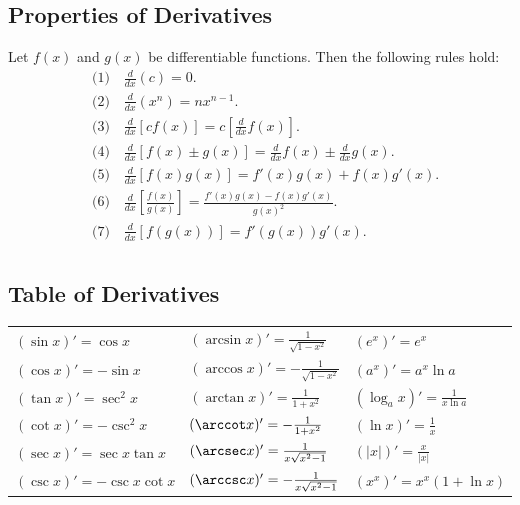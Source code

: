 \documentclass[a4paper,11pt]{article}
\begin{document}
\subsection{Properties of Derivatives}

\begin{tcolorbox}
    Let $f(x)$ and $g(x)$ be differentiable functions. Then the following rules hold:
    \[
    \begin{aligned}
        &\text{(1)} \quad \frac{d}{dx}(c) = 0. \\[8pt]  
        &\text{(2)} \quad \frac{d}{dx}(x^n) = nx^{n-1}. \\[8pt]
        &\text{(3)} \quad \frac{d}{dx}[cf(x)] = c[\frac{d}{dx}f(x)]. \\[8pt]
        &\text{(4)} \quad \frac{d}{dx}[f(x) \pm g(x)] = \frac{d}{dx}f(x) \pm \frac{d}{dx}g(x). \\[8pt]
        &\text{(5)} \quad \frac{d}{dx}[f(x)g(x)] = f'(x)g(x) + f(x)g'(x). \\[8pt]
        &\text{(6)} \quad \frac{d}{dx}[\frac{f(x)}{g(x)}] = \frac{f'(x)g(x) - f(x)g'(x)}{g(x)^2}. \\[8pt]
        &\text{(7)} \quad \frac{d}{dx}[f(g(x))] = f'(g(x))g'(x). \\[8pt]
    \end{aligned}
    \]
\end{tcolorbox}




\subsection{Table of Derivatives}

\begin{tcolorbox}
    \begin{tabularx}{\textwidth}{X|X|X}
         $(\sin x)' = \cos x$ & 
         $(\arcsin x)' = \frac{1}{\sqrt{1-x^2}}$ & 
         $(e^x)' = e^x$ \\[10pt]
         
         $(\cos x)' = -\sin x$ & 
         $(\arccos x)' = -\frac{1}{\sqrt{1-x^2}}$ & 
         $(a^x)' = a^x\ln{a}$ \\[10pt]
         
         $(\tan x)' = \sec^2 x$ & 
         $(\arctan x)' = \frac{1}{1+x^2}$ & 
         $(\log_a{x})' = \frac{1}{x\ln{a}}$ \\[10pt]
         
         $(\cot x)' = -\csc^2 x$ & 
         $(\arccot x)' = -\frac{1}{1+x^2}$ & 
         $(\ln{x})' = \frac{1}{x}$ \\[10pt]
         
         $(\sec x)' = \sec x \tan x $ & 
         $(\arcsec x)' = \frac{1}{x\sqrt{x^2-1}}$ & 
         $(\left| x \right|)' = \frac{x}{|x|}$ \\[10pt]
         
         $(\csc x)' = -\csc x \cot x $ & 
         $(\arccsc x)' = -\frac{1}{x\sqrt{x^2-1}}$ & 
         $(x^x)' = x^x(1+\ln{x})$ \\[10pt]
    \end{tabularx}
\end{tcolorbox}
\end{document}
